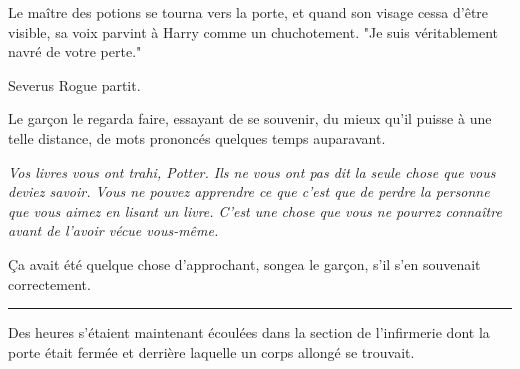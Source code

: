 Le maître des potions se tourna vers la porte, et quand son visage cessa d'être visible, sa voix parvint à Harry comme un chuchotement. "Je suis véritablement navré de votre perte."

Severus Rogue partit.

Le garçon le regarda faire, essayant de se souvenir, du mieux qu'il puisse à une telle distance, de mots prononcés quelques temps auparavant.

\emph{Vos livres vous ont trahi, Potter. Ils ne vous ont pas dit la seule chose que vous deviez savoir. Vous ne pouvez apprendre ce que c'est que de perdre la personne que vous aimez en lisant un livre. C'est une chose que vous ne pourrez connaître avant de l'avoir vécue vous-même.} 

Ça avait été quelque chose d'approchant, songea le garçon, s'il s'en souvenait correctement.
\par\noindent\rule{\textwidth}{0.4pt}
Des heures s'étaient maintenant écoulées dans la section de l'infirmerie dont la porte était fermée et derrière laquelle un corps allongé se trouvait.

